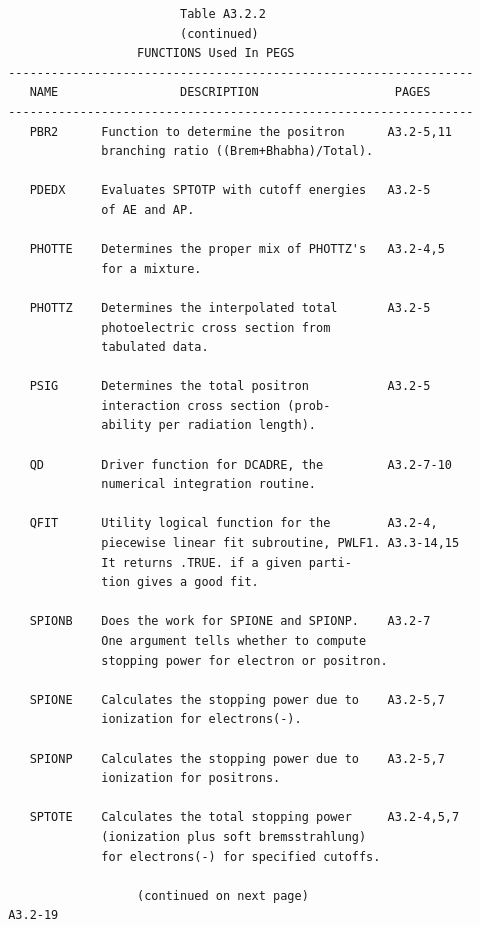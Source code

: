 \newpage {} \begin{verbatim}
                         Table A3.2.2
                         (continued)
                   FUNCTIONS Used In PEGS
 -----------------------------------------------------------------
    NAME                 DESCRIPTION                   PAGES
 -----------------------------------------------------------------
    PBR2      Function to determine the positron      A3.2-5,11
              branching ratio ((Brem+Bhabha)/Total).
 
    PDEDX     Evaluates SPTOTP with cutoff energies   A3.2-5
              of AE and AP.
 
    PHOTTE    Determines the proper mix of PHOTTZ's   A3.2-4,5
              for a mixture.
 
    PHOTTZ    Determines the interpolated total       A3.2-5
              photoelectric cross section from
              tabulated data.
 
    PSIG      Determines the total positron           A3.2-5
              interaction cross section (prob-
              ability per radiation length).
 
    QD        Driver function for DCADRE, the         A3.2-7-10
              numerical integration routine.
 
    QFIT      Utility logical function for the        A3.2-4,
              piecewise linear fit subroutine, PWLF1. A3.3-14,15
              It returns .TRUE. if a given parti-
              tion gives a good fit.
 
    SPIONB    Does the work for SPIONE and SPIONP.    A3.2-7
              One argument tells whether to compute
              stopping power for electron or positron.
 
    SPIONE    Calculates the stopping power due to    A3.2-5,7
              ionization for electrons(-).
 
    SPIONP    Calculates the stopping power due to    A3.2-5,7
              ionization for positrons.
 
    SPTOTE    Calculates the total stopping power     A3.2-4,5,7
              (ionization plus soft bremsstrahlung)
              for electrons(-) for specified cutoffs.
 
                   (continued on next page)
 A3.2-19 
\end{verbatim} 
